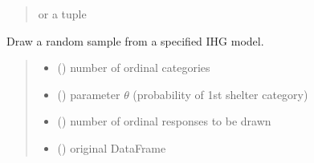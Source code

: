 \documentclass[letterpaper,10pt,english]{sphinxmanual}
\begin{document}
\begin{fulllineitems}
\begin{fulllineitems}
\begin{quote}
\begin{description}
\begin{itemize}
\end{itemize}

\sphinxAtStartPar
{} or a tuple 

\end{description}\end{quote}

\end{fulllineitems}


\end{fulllineitems}


\begin{fulllineitems}
\label{\detokenize{cubmods:cubmods.ihg.draw}}
\pysigstartsignatures
{}
\pysigstopsignatures
\sphinxAtStartPar
Draw a random sample from a specified IHG model.
\begin{quote}\begin{description}
\begin{itemize}
\item {} 
\sphinxAtStartPar
{} () \textendash{} number of ordinal categories

\item {} 
\sphinxAtStartPar
{} () \textendash{} parameter \(\theta\) (probability of 1st shelter category)

\item {} 
\sphinxAtStartPar
{} () \textendash{} number of ordinal responses to be drawn

\item {} 
\sphinxAtStartPar
{} () \textendash{} original DataFrame


\end{itemize}
\end{description}
\end{quote}
\end{fulllineitems}
\end{document}
